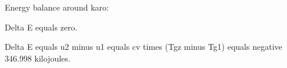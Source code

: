 Energy balance around karo:

Delta E equals zero.

Delta E equals u2 minus u1 equals cv times (Tgz minus Tg1) equals negative 346.998 kilojoules.